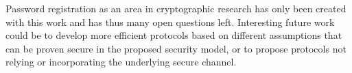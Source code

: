 Password registration as an area in cryptographic research has only been created with this work and has thus many open questions left.
Interesting future work could be to develop more efficient protocols based on different assumptions that can be proven secure in the proposed security model, or to propose protocols not relying or incorporating the underlying secure channel.
